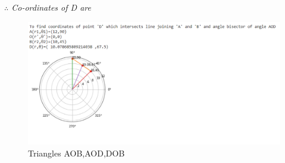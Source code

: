 \documentclass[journal,12pt,twocolumn]{IEEEtran}
\begin{document}
\textsl{$\therefore$ Co-ordinates of D are }

\begin{figure}[!ht]
    \center
    \includegraphics[width=\columnwidth]{BoP_assignment_1.PNG}
    \caption{Triangles AOB,AOD,DOB}
    \label{fig:Quad PQRS}
\end{figure}
\end{document}
